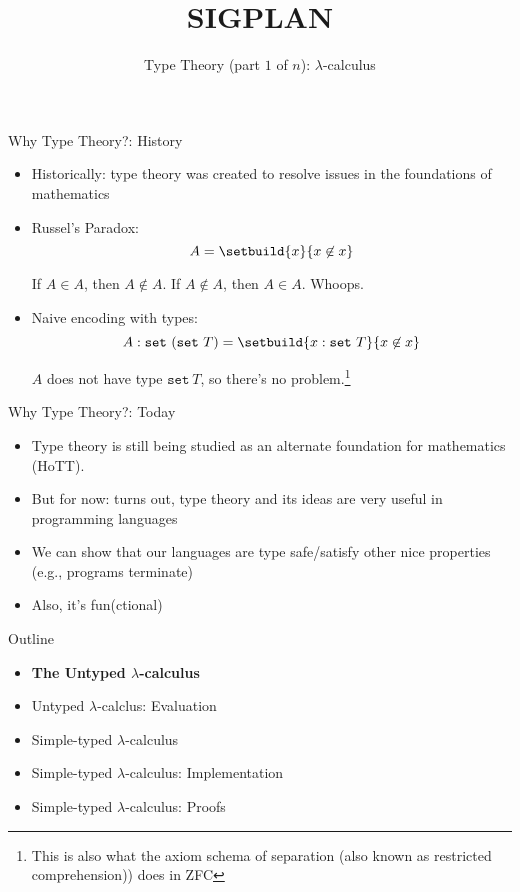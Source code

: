 \documentclass[leqno,presentation,usenames,dvipsnames]{beamer}
\title{SIGPLAN}
\subtitle{Type Theory (part $1$ of $n$): $\lambda$-calculus}
\date{}
\begin{document}
\frame{\titlepage}

\begin{frame}{Why Type Theory?: History}
    \begin{itemize}
        \item Historically: type theory was created to resolve issues in the foundations of mathematics
        \item Russel's Paradox:
            \[
                A = \setbuild{x}{x \not\in x}
            \]

            If $A \in A$, then $A \not\in A$.
            If $A \not\in A$, then $A \in A$.
            Whoops.

        \item Naive encoding with types:
            \[
                A : \texttt{set}~(\texttt{set}~T) = \setbuild{x : \texttt{set}~T}{x \not\in x}
            \]

            $A$ does not have type $\texttt{set}~T$, so there's no problem.\footnote{This is also what the axiom schema of separation (also known as restricted comprehension)) does in ZFC}
    \end{itemize}
\end{frame}

\begin{frame}{Why Type Theory?: Today}
    \begin{itemize}
        \item Type theory is still being studied as an alternate foundation for mathematics (HoTT).
        \item But for now: turns out, type theory and its ideas are very useful in programming languages
        \item We can show that our languages are type safe/satisfy other nice properties (e.g., programs terminate)
        \item Also, it's fun(ctional)
    \end{itemize}
\end{frame}

\begin{frame}{Outline}
    \begin{itemize}
        \item \textbf{The Untyped $\lambda$-calculus}
        \item Untyped $\lambda$-calclus: Evaluation
        \item Simple-typed $\lambda$-calculus
        \item Simple-typed $\lambda$-calculus: Implementation
        \item Simple-typed $\lambda$-calculus: Proofs
    \end{itemize}
\end{frame}
\end{document}
